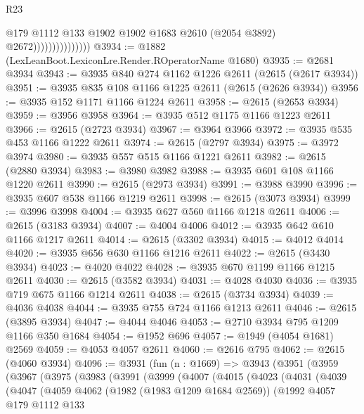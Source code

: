 \begin{lexlean}{R23}
\begin{coremodule}
                                  @179
                                  @1112
                                  @133
                                  @1902
                                  @1902
                                  @1683
                                  @2610
                                  (@2054 @3892)
                                  @2672)))))))))))))))
@3934 := @1882 (LexLeanBoot.LexiconLre.Render.ROperatorName @1680)
@3935 := @2681 @3934
@3943 := @3935 @840 @274 @1162 @1226 @2611 (@2615 (@2617 @3934))
@3951 := @3935 @835 @108 @1166 @1225 @2611 (@2615 (@2626 @3934))
@3956 := @3935 @152 @1171 @1166 @1224 @2611
@3958 := @2615 (@2653 @3934)
@3959 := @3956 @3958
@3964 := @3935 @512 @1175 @1166 @1223 @2611
@3966 := @2615 (@2723 @3934)
@3967 := @3964 @3966
@3972 := @3935 @535 @453 @1166 @1222 @2611
@3974 := @2615 (@2797 @3934)
@3975 := @3972 @3974
@3980 := @3935 @557 @515 @1166 @1221 @2611
@3982 := @2615 (@2880 @3934)
@3983 := @3980 @3982
@3988 := @3935 @601 @108 @1166 @1220 @2611
@3990 := @2615 (@2973 @3934)
@3991 := @3988 @3990
@3996 := @3935 @607 @538 @1166 @1219 @2611
@3998 := @2615 (@3073 @3934)
@3999 := @3996 @3998
@4004 := @3935 @627 @560 @1166 @1218 @2611
@4006 := @2615 (@3183 @3934)
@4007 := @4004 @4006
@4012 := @3935 @642 @610 @1166 @1217 @2611
@4014 := @2615 (@3302 @3934)
@4015 := @4012 @4014
@4020 := @3935 @656 @630 @1166 @1216 @2611
@4022 := @2615 (@3430 @3934)
@4023 := @4020 @4022
@4028 := @3935 @670 @1199 @1166 @1215 @2611
@4030 := @2615 (@3582 @3934)
@4031 := @4028 @4030
@4036 := @3935 @719 @675 @1166 @1214 @2611
@4038 := @2615 (@3734 @3934)
@4039 := @4036 @4038
@4044 := @3935 @755 @724 @1166 @1213 @2611
@4046 := @2615 (@3895 @3934)
@4047 := @4044 @4046
@4053 := @2710 @3934 @795 @1209 @1166 @350 @1684
@4054 := @1952 @696
@4057 := @1949 (@4054 @1681) @2569
@4059 := @4053 @4057 @2611
@4060 := @2616 @795
@4062 := @2615 (@4060 @3934)
@4096 := @3931
    (fun (n : @1669) =>
    @3943
      (@3951
        (@3959
          (@3967
            (@3975
              (@3983
                (@3991
                  (@3999
                    (@4007
                      (@4015
                        (@4023
                          (@4031
                            (@4039
                              (@4047
                                (@4059
                                  @4062
                                  (@1982 (@1983 @1209 @1684 @2569))
                                  (@1992
                                    @4057
                                    @179
                                    @1112
                                    @133

\end{coremodule}
\end{lexlean}
